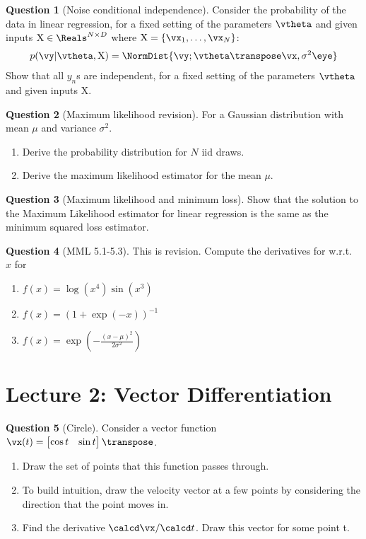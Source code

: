 \documentclass[a4paper]{article}
\newcommand{\mat}[1]{{\mathrm{{#1}}}} %
\theoremstyle{definition}
\newtheorem{question}{Question}
\begin{document}
\begin{question}[Noise conditional independence]
Consider the probability of the data in linear regression, for a fixed setting of the parameters $\vtheta$ and given inputs $\mat X \in \Reals^{N\times D}$ where $\mat X = \{\vx_1, \dots, \vx_N\}$:
\begin{align}
p(\vy|\vtheta,\mat X) = \NormDist{\vy; \vtheta\transpose\vx, \sigma^2 \eye}
\end{align}
Show that all $y_n$s are independent, for a fixed setting of the parameters $\vtheta$ and given inputs $\mat X$.
\end{question}

\begin{question}[Maximum likelihood revision] For a Gaussian distribution with mean $\mu$ and variance $\sigma^2$.
\begin{enumerate}[label=\alph*.]
\item Derive the probability distribution for $N$ iid draws.
\item Derive the maximum likelihood estimator for the mean $\mu$.
\end{enumerate}
\end{question}

\begin{question}[Maximum likelihood and minimum loss]
Show that the solution to the Maximum Likelihood estimator for linear regression is the same as the minimum squared loss estimator.
\end{question}

\begin{question}[MML 5.1-5.3]
This is revision. Compute the derivatives for w.r.t.~$x$ for
\begin{enumerate}[label=\alph*.]
\item $f(x) = \log (x^4) \sin (x^3)$
\item $f(x) = (1 + \exp(-x))^{-1}$
\item $f(x) = \exp\left(-\frac{(x-\mu)^2}{2\sigma^2}\right)$
\end{enumerate}
\end{question}

\section{Lecture 2: Vector Differentiation}
\begin{question}[Circle]
\label{q:circle}
Consider a vector function $\vx(t) = \begin{bmatrix}\cos t & \sin t\end{bmatrix}\transpose$.
\begin{enumerate}[label=\alph*.]
\item Draw the set of points that this function passes through.
\item To build intuition, draw the velocity vector at a few points by considering the direction that the point moves in.
\item Find the derivative $\calcd\vx / \calcd t$. Draw this vector for some point t.
\end{enumerate}
\end{question}
\end{document}
